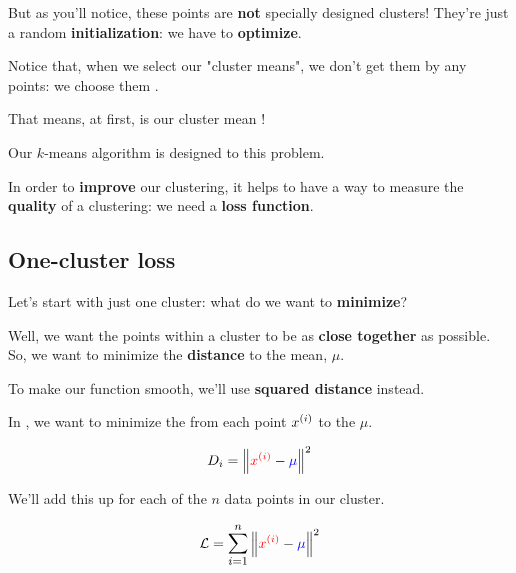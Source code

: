         But as you'll notice, these points are \textbf{not} specially designed clusters! They're just a random \textbf{initialization}: we have to \textbf{optimize}.\\
        
        \begin{clarification}
            Notice that, when we  select our "cluster means", we don't get them by  any points: we choose them .
            
            That means, at first, is our cluster mean !
            
            Our $k$-means algorithm is designed to  this problem.
        \end{clarification}

        
        In order to \textbf{improve} our clustering, it helps to have a way to measure the \textbf{quality} of a clustering: we need a \textbf{loss function}.
    
    \subsection{One-cluster loss}
    
        Let's start with just one cluster: what do we want to \textbf{minimize}? 
        
        Well, we want the points within a cluster to be as \textbf{close together} as possible. So, we want to minimize the \textbf{distance} to the mean, $\mu$.
        
        To make our function smooth, we'll use \textbf{squared distance} instead.\\
        
        \begin{concept}
            In , we want to minimize the  from each point $x^{(i)}$ to the  $\mu$.
        \end{concept}
        
        \begin{equation}
            D_i = \left\lVert \textcolor{red}{x^{(i)} } - \textcolor{blue}{\mu} \right\rVert^2
        \end{equation}
        
        We'll add this up for each of the $n$ data points in our cluster.
        
        \begin{equation}
            \loss = \mathlarger{\sum_{i=1}^n} 
                \norm{ \rxi - \blu{\mu} }^2
        \end{equation}
        
